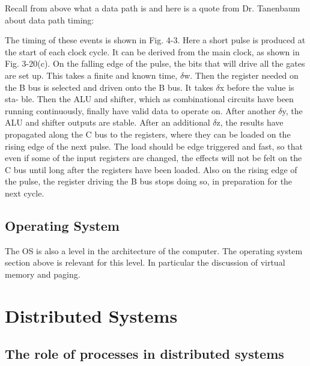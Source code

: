 \documentclass{amsbook}
\begin{document}
Recall from above what a data path is and here is a quote from Dr. Tanenbaum about data path timing: 
\begin{displayquote}
The timing of these events is shown in Fig. 4-3. Here a short pulse is produced
at the start of each clock cycle. It can be derived from the main clock, as shown in
Fig. 3-20(c). On the falling edge of the pulse, the bits that will drive all the gates
are set up. This takes a finite and known time, $\delta$w. Then the register needed on
the B bus is selected and driven onto the B bus. It takes $\delta$x before the value is sta-
ble. Then the ALU and shifter, which as combinational circuits have been running
continuously, finally have valid data to operate on. After another $\delta$y, the ALU and
shifter outputs are stable. After an additional $\delta$z, the results have propagated along
the C bus to the registers, where they can be loaded on the rising edge of the next
pulse. The load should be edge triggered and fast, so that even if some of the input
registers are changed, the effects will not be felt on the C bus until long after the
registers have been loaded. Also on the rising edge of the pulse, the register driving the B bus stops doing so, in preparation for the next cycle.
\end{displayquote}

\section{Operating System}

The OS is also a level in the architecture of the computer. The operating system section above is relevant for this level. In particular the discussion of virtual memory and paging.

\chapter{Distributed Systems}

\section{The role of processes in distributed systems}
\end{document}
